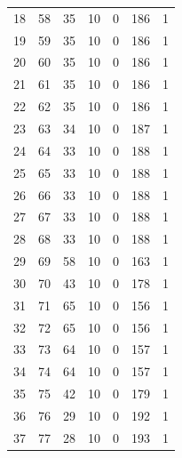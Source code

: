 \documentclass[a4paper,twoside,12pt]{book}
\begin{document}
\begin{appendices}
\begin{table}
\begin{tabular}{lrrrrrr}
		18  &     58 &        35 &        10 &               0 &             186 &         1 \\
		19  &     59 &        35 &        10 &               0 &             186 &         1 \\
		20  &     60 &        35 &        10 &               0 &             186 &         1 \\
		21  &     61 &        35 &        10 &               0 &             186 &         1 \\
		22  &     62 &        35 &        10 &               0 &             186 &         1 \\
		23  &     63 &        34 &        10 &               0 &             187 &         1 \\
		24  &     64 &        33 &        10 &               0 &             188 &         1 \\
		25  &     65 &        33 &        10 &               0 &             188 &         1 \\
		26  &     66 &        33 &        10 &               0 &             188 &         1 \\
		27  &     67 &        33 &        10 &               0 &             188 &         1 \\
		28  &     68 &        33 &        10 &               0 &             188 &         1 \\
		29  &     69 &        58 &        10 &               0 &             163 &         1 \\
		30  &     70 &        43 &        10 &               0 &             178 &         1 \\
		31  &     71 &        65 &        10 &               0 &             156 &         1 \\
		32  &     72 &        65 &        10 &               0 &             156 &         1 \\
		33  &     73 &        64 &        10 &               0 &             157 &         1 \\
		34  &     74 &        64 &        10 &               0 &             157 &         1 \\
		35  &     75 &        42 &        10 &               0 &             179 &         1 \\
		36  &     76 &        29 &        10 &               0 &             192 &         1 \\
		37  &     77 &        28 &        10 &               0 &             193 &         1 \\

\end{tabular}
\end{table}
\end{appendices}
\end{document}
